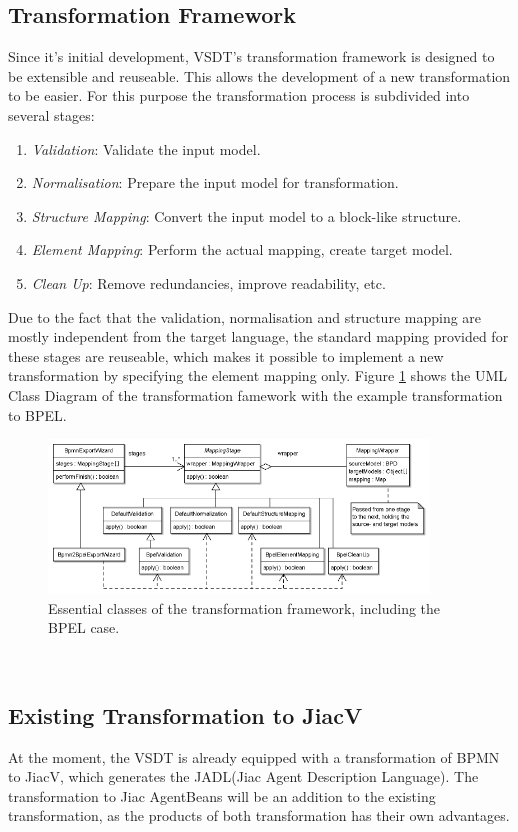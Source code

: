 \subsection{Transformation Framework}
Since it's initial development, VSDT's transformation framework is designed to be extensible and reuseable. This allows the development of a new transformation to be easier. For this purpose the transformation process is subdivided into several stages: 
\begin{enumerate}
	\item \textit{Validation}: Validate the input model.
	\item \textit{Normalisation}: Prepare the input model for transformation.
	\item \textit{Structure Mapping}: Convert the input model to a block-like structure.
	\item \textit{Element Mapping}: Perform the actual mapping, create target model.
	\item \textit{Clean Up}: Remove redundancies, improve readability, etc.
\end{enumerate}

Due to the fact that the validation, normalisation and structure mapping are mostly independent from the target language, the standard mapping provided for these stages are reuseable, which makes it possible to implement a new transformation by specifying the element mapping only. Figure \ref{fig:transform} shows the UML Class Diagram of the transformation famework with the example transformation to BPEL.
\begin{figure}[h]
	\centering
		\includegraphics[width=0.90\textwidth]{images/transformation.png}
	\caption{Essential classes of the transformation framework, including the BPEL case.\cite{TK07}}
	\label{fig:transform}
\end{figure}\\

\subsection{Existing Transformation to JiacV}
At the moment, the VSDT is already equipped with a transformation of BPMN to JiacV, which generates the JADL(Jiac Agent Description Language).
The transformation to Jiac AgentBeans will be an addition to the existing transformation, as the products of both transformation has their own advantages.

